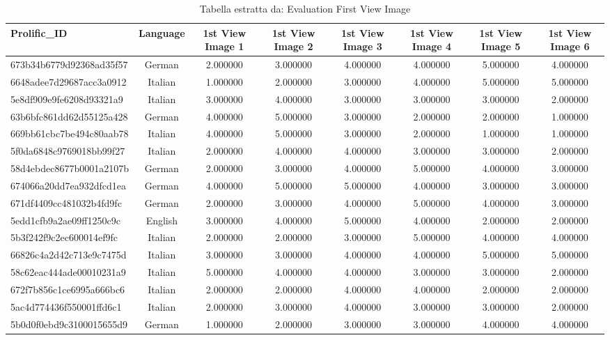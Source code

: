 \begin{table}[htbp]
\caption{Tabella estratta da: Evaluation First View Image}
\label{tab:evaluation first view image}
\begin{tabular}{lccccccc}
\toprule
Prolific\_ID & Language & 1st View Image 1 & 1st View Image 2 & 1st View Image 3 & 1st View Image 4 & 1st View Image 5 & 1st View Image 6 \\
\midrule
673b34b6779d92368ad35f57 & German & 2.000000 & 3.000000 & 4.000000 & 4.000000 & 5.000000 & 4.000000 \\
6648adee7d29687acc3a0912 & Italian & 1.000000 & 2.000000 & 3.000000 & 4.000000 & 5.000000 & 5.000000 \\
5e8df909e9fe6208d93321a9 & Italian & 3.000000 & 4.000000 & 3.000000 & 3.000000 & 3.000000 & 2.000000 \\
63b6bfc861dd62d55125a428 & German & 4.000000 & 5.000000 & 3.000000 & 2.000000 & 2.000000 & 1.000000 \\
669bb61cbc7be494c80aab78 & Italian & 4.000000 & 5.000000 & 3.000000 & 2.000000 & 1.000000 & 1.000000 \\
5f0da6848c9769018bb99f27 & Italian & 2.000000 & 4.000000 & 4.000000 & 3.000000 & 3.000000 & 2.000000 \\
58d4ebdec8677b0001a2107b & German & 2.000000 & 3.000000 & 4.000000 & 5.000000 & 4.000000 & 3.000000 \\
674066a20dd7ea932dfcd1ea & German & 4.000000 & 5.000000 & 5.000000 & 4.000000 & 3.000000 & 3.000000 \\
671df4409cc481032b4fd9fc & German & 2.000000 & 3.000000 & 4.000000 & 5.000000 & 4.000000 & 3.000000 \\
5edd1cfb9a2ae09ff1250c9c & English & 3.000000 & 4.000000 & 5.000000 & 4.000000 & 2.000000 & 2.000000 \\
5b3f242f9c2ec600014ef9fc & Italian & 2.000000 & 2.000000 & 3.000000 & 5.000000 & 4.000000 & 4.000000 \\
66826c4a2d42c713e9c7475d & Italian & 3.000000 & 3.000000 & 4.000000 & 4.000000 & 5.000000 & 5.000000 \\
58c62eac444ade00010231a9 & Italian & 5.000000 & 4.000000 & 4.000000 & 3.000000 & 3.000000 & 2.000000 \\
672f7b856c1ce6995a666bc6 & Italian & 2.000000 & 2.000000 & 4.000000 & 4.000000 & 2.000000 & 2.000000 \\
5ac4d774436f550001ffd6c1 & Italian & 2.000000 & 3.000000 & 4.000000 & 3.000000 & 3.000000 & 2.000000 \\
5b0d0f0ebd9c3100015655d9 & German & 1.000000 & 2.000000 & 3.000000 & 3.000000 & 4.000000 & 4.000000 \\

\end{tabular}
\end{table}
